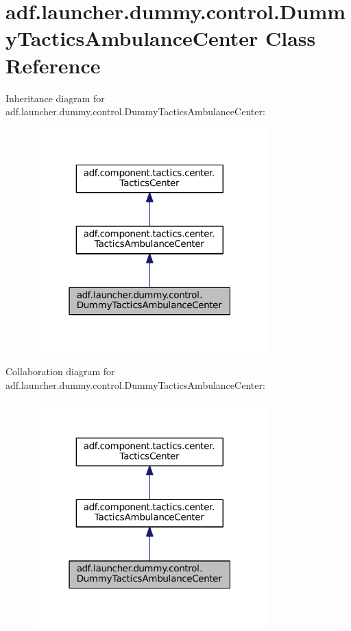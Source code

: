 \hypertarget{classadf_1_1launcher_1_1dummy_1_1control_1_1DummyTacticsAmbulanceCenter}{}\section{adf.\+launcher.\+dummy.\+control.\+Dummy\+Tactics\+Ambulance\+Center Class Reference}
\label{classadf_1_1launcher_1_1dummy_1_1control_1_1DummyTacticsAmbulanceCenter}


Inheritance diagram for adf.\+launcher.\+dummy.\+control.\+Dummy\+Tactics\+Ambulance\+Center\+:
\nopagebreak
\begin{figure}[H]
\begin{center}
\leavevmode
\includegraphics[width=256pt]{classadf_1_1launcher_1_1dummy_1_1control_1_1DummyTacticsAmbulanceCenter__inherit__graph}
\end{center}
\end{figure}


Collaboration diagram for adf.\+launcher.\+dummy.\+control.\+Dummy\+Tactics\+Ambulance\+Center\+:
\nopagebreak
\begin{figure}[H]
\begin{center}
\leavevmode
\includegraphics[width=256pt]{classadf_1_1launcher_1_1dummy_1_1control_1_1DummyTacticsAmbulanceCenter__coll__graph}
\end{center}
\end{figure}
